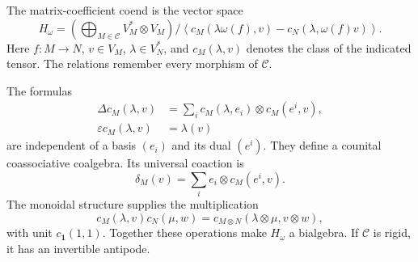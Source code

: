 The matrix-coefficient coend is the vector space
\begin{equation}\label{eq:vol2-coend}
 H_\omega=
 \left(\bigoplus_{M\in\mathcal C}V_M^*\otimes V_M\right)
 \big/
 \left\langle
 c_M(\lambda\omega(f),v)-c_N(\lambda,\omega(f)v)
 \right\rangle.
\end{equation}
Here $f:M\to N$, $v\in V_M$, $\lambda\in V_N^*$, and
$c_M(\lambda,v)$ denotes the class of the indicated tensor.
The relations remember every morphism of $\mathcal C$.

\begin{proposition}\label{prop:vol2-coend-operations}
The formulas
\begin{equation}\label{eq:vol2-coend-coalgebra}
\begin{aligned}
 \Delta c_M(\lambda,v)
   &=\sum_i c_M(\lambda,e_i)\otimes c_M(e^i,v),\\
 \varepsilon c_M(\lambda,v)&=\lambda(v)
\end{aligned}
\end{equation}
are independent of a basis $(e_i)$ and its dual $(e^i)$.
They define a counital coassociative coalgebra.
Its universal coaction is
\[
 \delta_M(v)=\sum_i e_i\otimes c_M(e^i,v).
\]
The monoidal structure supplies the multiplication
\begin{equation}\label{eq:vol2-coend-product}
 c_M(\lambda,v)c_N(\mu,w)
   =c_{M\otimes N}(\lambda\otimes\mu,v\otimes w),
\end{equation}
with unit $c_{\mathbf1}(1,1)$.
Together these operations make $H_\omega$ a bialgebra.
If $\mathcal C$ is rigid, it has an invertible antipode.
\end{proposition}
